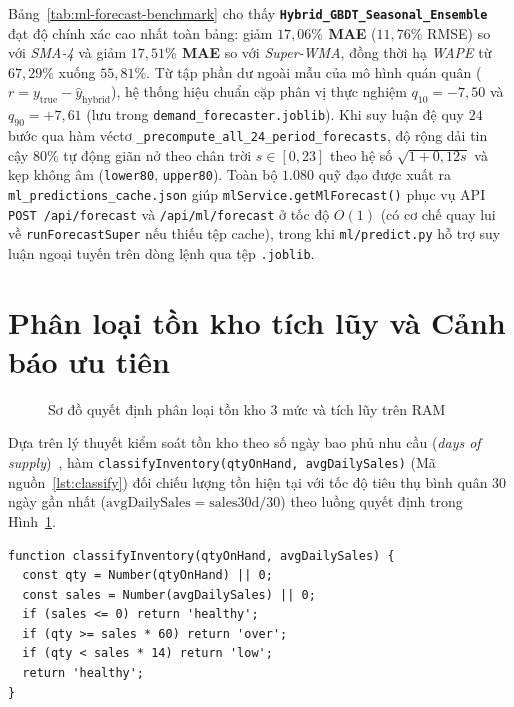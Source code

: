 Bảng~\ref{tab:ml-forecast-benchmark} cho thấy \textbf{\texttt{Hybrid_GBDT_Seasonal_Ensemble}} đạt độ chính xác cao nhất toàn bảng: giảm \textbf{$17{,}06\%$ MAE} ($11{,}76\%$ RMSE) so với \textit{SMA-4} và giảm \textbf{$17{,}51\%$ MAE} so với \textit{Super-WMA}, đồng thời hạ \textit{WAPE} từ $67{,}29\%$ xuống $55{,}81\%$. Từ tập phần dư ngoài mẫu của mô hình quán quân ($r = y_{\text{true}} - \hat{y}_{\text{hybrid}}$), hệ thống hiệu chuẩn cặp phân vị thực nghiệm $q_{10} = -7{,}50$ và $q_{90} = +7{,}61$ (lưu trong \texttt{demand_forecaster.joblib}). Khi suy luận đệ quy $24$ bước qua hàm véctơ \texttt{\_precompute\_all\_\allowbreak{}24\_period\_forecasts}, độ rộng dải tin cậy $80\%$ tự động giãn nở theo chân trời $s \in [0, 23]$ theo hệ số $\sqrt{1 + 0{,}12 s}$ và kẹp không âm (\texttt{lower80}, \texttt{upper80}). Toàn bộ $1.080$ quỹ đạo được xuất ra \texttt{ml\_\allowbreak{}predictions\_\allowbreak{}cache.json} giúp \texttt{mlService.getMlForecast()} phục vụ API \texttt{POST /api/forecast} và \texttt{/api/ml/forecast} ở tốc độ $O(1)$ (có cơ chế quay lui về \texttt{runForecastSuper} nếu thiếu tệp cache), trong khi \texttt{ml/predict.py} hỗ trợ suy luận ngoại tuyến trên dòng lệnh qua tệp \texttt{.joblib}.

\section{Phân loại tồn kho tích lũy và Cảnh báo ưu tiên}
\label{sec:ch4-inventory}
\begin{figure}[H]
	\centering
	\caption{Sơ đồ quyết định phân loại tồn kho $3$ mức và tích lũy trên RAM}
	\label{fig:inventory_classify_flow}
\end{figure}

Dựa trên lý thuyết kiểm soát tồn kho theo số ngày bao phủ nhu cầu (\textit{days of supply})~\cite{silver2016inventory}, hàm \texttt{classifyInventory(qtyOnHand, avgDailySales)} (Mã nguồn~\ref{lst:classify}) đối chiếu lượng tồn hiện tại với tốc độ tiêu thụ bình quân $30$ ngày gần nhất ($\text{avgDailySales} = \text{sales30d} / 30$) theo luồng quyết định trong Hình~\ref{fig:inventory_classify_flow}.

\begin{listing}[H]
	\begin{verbatim}
function classifyInventory(qtyOnHand, avgDailySales) {
  const qty = Number(qtyOnHand) || 0;
  const sales = Number(avgDailySales) || 0;
  if (sales <= 0) return 'healthy';
  if (qty >= sales * 60) return 'over';
  if (qty < sales * 14) return 'low';
  return 'healthy';
}
\end{verbatim}
	\caption{Hàm phân loại tồn kho thuần túy trong \texttt{backend/algorithms/classify.js}}
	\label{lst:classify}
\end{listing}

